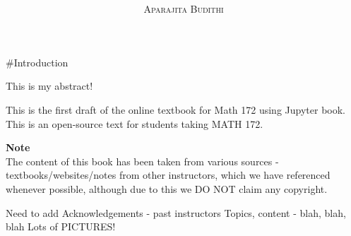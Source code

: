 \documentclass[a4paper,11pt,oneside]{book}
\title{\Huge \textbf{}}
\author{\textsc{Aparajita Budithi}}
\begin{document}
\sloppy

\frontmatter
\maketitle

\tableofcontents

\mainmatter

% 
% 

\#Introduction

This is my abstract!

This is the first draft of the online textbook for Math 172 using Jupyter book. This is an open-source text for students taking MATH 172.

\begin{framed}
\textbf{Note}\\
The content of this book has been taken from various sources - textbooks/websites/notes from other instructors, which we have referenced whenever possible, although due to this we DO NOT claim any copyright.

Need to add Acknowledgements - past instructors
Topics, content - blah, blah, blah
Lots of PICTURES!
\end{framed}
\end{document}

